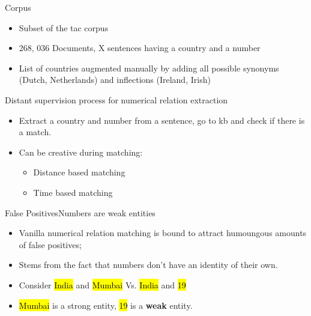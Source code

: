 \documentclass{beamer}
\makeatletter
\newcommand\SoulColor{%
  \let\set@color\beamerorig@set@color
  \let\reset@color\beamerorig@reset@color}
\makeatother
\begin{document}
\begin{frame}{Corpus}
\begin{itemize}
 \item Subset of the tac corpus
 \item 268, 036 Documents, X sentences having a country and a number 
 \item List of countries augmented manually by adding all possible synonyms (Dutch, Netherlands) and inflections (Ireland, Irish)
\end{itemize}

 
\end{frame}
\begin{frame}{Distant supervision process for numerical relation extraction}
 \begin{itemize}
  \item Extract a country and number from a sentence, go to kb and check if there is a match.
  \item Can be creative during matching:
  \begin{itemize}
   \item Distance based matching
   \item Time based matching
  \end{itemize}
 \end{itemize}
\end{frame}
\begin{frame}{False Positives}{Numbers are weak entities}
\begin{itemize}
 \item Vanilla numerical relation matching is bound to attract humoungous amounts of false positives;
 \item Stems from the fact that numbers don't have an identity of their own.
 \item Consider {\SoulColor\hl{India}} and {\SoulColor\hl{Mumbai}} Vs. {\SoulColor\hl{India}} and {\SoulColor\hl{19}}
 \item {\SoulColor\hl{Mumbai}} is a strong entity, {\SoulColor\hl{19}} is a \textbf{weak} entity.
 \end{itemize}
\end{frame}
\end{document}
